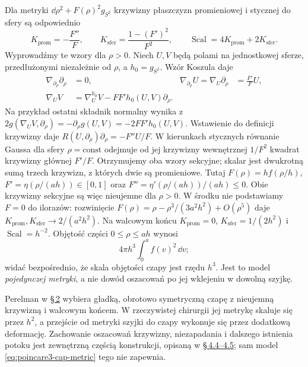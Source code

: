 \begin{przyklad}
Dla metryki $\dd\rho^2+F(\rho)^2g_{S^2}$
krzywizny płaszczyzn promieniowej i stycznej
do sfery są odpowiednio
\begin{equation}\label{eq:poincare3-cap-curvatures}
 K_{\mathrm{prom}}=-\frac{F''}{F},\qquad
 K_{\mathrm{sfer}}=\frac{1-(F')^2}{F^2},\qquad
 \operatorname{Scal}=4K_{\mathrm{prom}}
                         +2K_{\mathrm{sfer}}.
\end{equation}
Wyprowadźmy te wzory dla $\rho>0$. Niech $U,V$ będą polami
na jednostkowej sferze, przedłużonymi niezależnie od $\rho$,
a $h_0=g_{S^2}$. Wzór Koszula daje
\[
 \begin{aligned}
 \nabla_{\partial_\rho}\partial_\rho&=0,&
 \nabla_{\partial_\rho}U=\nabla_U\partial_\rho&=\frac{F'}F U,\\
 \nabla_UV&=\nabla^{h_0}_UV-FF'h_0(U,V)\partial_\rho.
 \end{aligned}
\]
Na przykład ostatni składnik normalny wynika z
$2g(\nabla_UV,\partial_\rho)=-\partial_\rho g(U,V)
=-2FF'h_0(U,V)$. Wstawienie do definicji krzywizny daje
$R(U,\partial_\rho)\partial_\rho=-F''U/F$.
W kierunkach stycznych równanie Gaussa dla sfery
$\rho=\mathrm{const}$ odejmuje od jej krzywizny wewnętrznej
$1/F^2$ kwadrat krzywizny głównej $F'/F$.
Otrzymujemy oba wzory sekcyjne; skalar jest dwukrotną sumą
trzech krzywizn, z których dwie są promieniowe.
Tutaj $F(\rho)=hf(\rho/h)$,
$F'=\eta(\rho/(ah))\in[0,1]$ oraz
$F''=\eta'(\rho/(ah))/(ah)\leq0$.
Obie krzywizny sekcyjne są więc nieujemne dla $\rho>0$.
W środku nie podstawiamy $F=0$ do ilorazów: rozwinięcie
$F(\rho)=\rho-\rho^3/(3a^2h^2)+O(\rho^5)$ daje
$K_{\mathrm{prom}},K_{\mathrm{sfer}}\to2/(a^2h^2)$.
Na walcowym końcu
$K_{\mathrm{prom}}=0$,
$K_{\mathrm{sfer}}=1/(2h^2)$ i
$\operatorname{Scal}=h^{-2}$.
Objętość części $0\leq\rho\leq ah$ wynosi
\[
 4\pi h^3\int_0^a f(v)^2\,\dd v;
\]
widać bezpośrednio, że skala objętości
czapy jest rzędu $h^3$. Jest to model
\emph{pojedynczej metryki}, a nie dowód
oszacowań po jej wklejeniu w dowolną szyjkę.
\end{przyklad}

Perelman w \href{https://arxiv.org/html/math/0303109}
{\S\,2} wybiera gładką, obrotowo symetryczną
czapę z nieujemną krzywizną i walcowym końcem.
W rzeczywistej chirurgii jej metrykę skaluje
się przez $h^2$, a przejście od metryki
szyjki do czapy wykonuje się przez dodatkową
deformację. Zachowanie oszacowań krzywizny,
niezapadania i dalszego istnienia potoku jest
zewnętrzną częścią konstrukcji, opisaną
w \href{https://arxiv.org/html/math/0303109}
{\S\,4.4--4.5}; sam model
\eqref{eq:poincare3-cap-metric} tego nie zapewnia.

